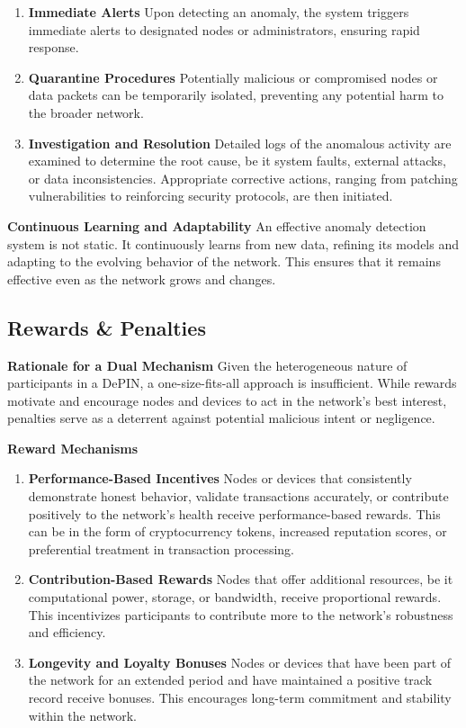 \documentclass{article}
\begin{document}
\begin{enumerate}

\item \textbf{Immediate Alerts}
Upon detecting an anomaly, the system triggers immediate alerts to designated nodes or administrators, ensuring rapid response.

\item \textbf{Quarantine Procedures}
Potentially malicious or compromised nodes or data packets can be temporarily isolated, preventing any potential harm to the broader network.

\item \textbf{Investigation and Resolution}
Detailed logs of the anomalous activity are examined to determine the root cause, be it system faults, external attacks, or data inconsistencies. Appropriate corrective actions, ranging from patching vulnerabilities to reinforcing security protocols, are then initiated.

\end{enumerate}

\textbf{Continuous Learning and Adaptability}
An effective anomaly detection system is not static. It continuously learns from new data, refining its models and adapting to the evolving behavior of the network. This ensures that it remains effective even as the network grows and changes.


\subsection{Rewards \& Penalties}

\textbf{Rationale for a Dual Mechanism}
Given the heterogeneous nature of participants in a DePIN, a one-size-fits-all approach is insufficient. While rewards motivate and encourage nodes and devices to act in the network's best interest, penalties serve as a deterrent against potential malicious intent or negligence.

\textbf{Reward Mechanisms}
\begin{enumerate}

\item \textbf{Performance-Based Incentives}
Nodes or devices that consistently demonstrate honest behavior, validate transactions accurately, or contribute positively to the network's health receive performance-based rewards. This can be in the form of cryptocurrency tokens, increased reputation scores, or preferential treatment in transaction processing.

\item \textbf{Contribution-Based Rewards}
Nodes that offer additional resources, be it computational power, storage, or bandwidth, receive proportional rewards. This incentivizes participants to contribute more to the network's robustness and efficiency.

\item \textbf{Longevity and Loyalty Bonuses}
Nodes or devices that have been part of the network for an extended period and have maintained a positive track record receive bonuses. This encourages long-term commitment and stability within the network.
\end{enumerate}
\end{document}
